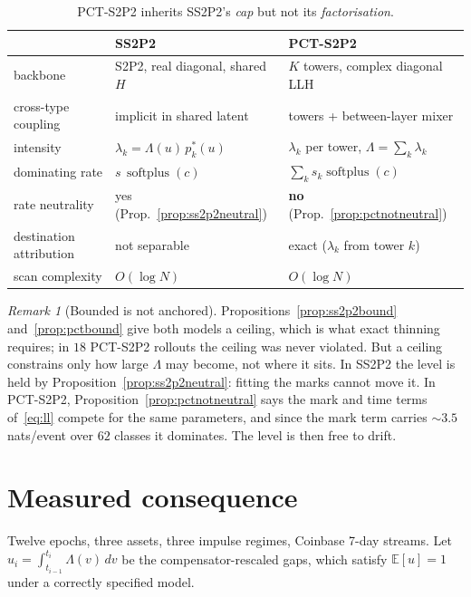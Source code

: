 \documentclass[11pt]{article}
\theoremstyle{remark}
\newtheorem{remark}{Remark}
\newcommand{\E}{\mathbb{E}}
\newcommand{\softplus}{\operatorname{softplus}}
\begin{document}
\begin{table}[h]
\centering
\begin{tabular}{lll}
\toprule
& \textbf{SS2P2} & \textbf{PCT-S2P2} \\
\midrule
backbone & S2P2, real diagonal, shared $H$ & $K$ towers, complex diagonal LLH \\
cross-type coupling & implicit in shared latent & towers + between-layer mixer \\
intensity & $\lambda_k = \Lambda(u)\,p^*_k(u)$ & $\lambda_k$ per tower, $\Lambda = \sum_k \lambda_k$ \\
dominating rate & $s\,\softplus(c)$ & $\sum_k s_k \softplus(c)$ \\
rate neutrality & yes (Prop.~\ref{prop:ss2p2neutral}) & \textbf{no} (Prop.~\ref{prop:pctnotneutral}) \\
destination attribution & not separable & exact ($\lambda_k$ from tower $k$) \\
scan complexity & $O(\log N)$ & $O(\log N)$ \\
\bottomrule
\end{tabular}
\caption{PCT-S2P2 inherits SS2P2's \emph{cap} but not its \emph{factorisation}.}
\end{table}

\begin{remark}[Bounded is not anchored]
Propositions~\ref{prop:ss2p2bound} and~\ref{prop:pctbound} give both models a
ceiling, which is what exact thinning requires; in $18$ PCT-S2P2 rollouts the
ceiling was never violated. But a ceiling constrains only how large $\Lambda$
may become, not where it sits. In SS2P2 the level is held by
Proposition~\ref{prop:ss2p2neutral}: fitting the marks cannot move it. In
PCT-S2P2, Proposition~\ref{prop:pctnotneutral} says the mark and time terms
of~\eqref{eq:ll} compete for the same parameters, and since the mark term
carries $\sim\!3.5$ nats/event over $62$ classes it dominates. The level is
then free to drift.
\end{remark}

\section{Measured consequence}

Twelve epochs, three assets, three impulse regimes, Coinbase 7-day streams.
Let $u_i = \int_{t_{i-1}}^{t_i}\Lambda(v)\,dv$ be the compensator-rescaled
gaps, which satisfy $\E[u] = 1$ under a correctly specified model.
\end{document}
